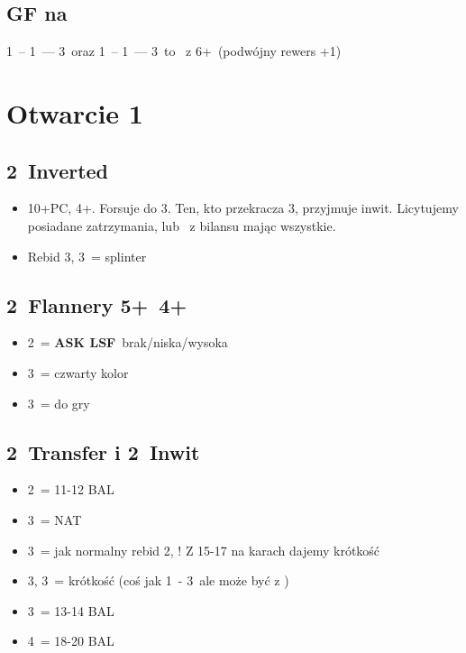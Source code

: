 \documentclass[12pt, a4paper]{article}
\newcommand{\lsf}{\color{WildStrawberry}\textbf{ASK LSF}\color{black}}
\newcommand*\link[1]{\hspace*{0em plus 1fill}\makebox{#1}}
\newcommand{\exq}{\color{JungleGreen}\link{\textbf{\large{?!}}}\color{black}}
\begin{document}
\subsection*{GF na \clubs}
1\clubs\ -- 1\hearts\ --- 3\diams\ oraz 1\clubs\ -- 1\spades\ --- 3\diams\ to \gf\ z 6+\clubs\ (podwójny rewers +1)


\pagebreak
\section{Otwarcie 1\diams}
\subsection{2\diams\ Inverted}
\begin{itemize}
    \item 10+PC, 4+\diams. Forsuje do 3\diams. Ten, kto przekracza 3\diams, przyjmuje inwit.
    Licytujemy posiadane zatrzymania, lub \nt\ z bilansu mając wszystkie.
    \item Rebid 3\hearts, 3\spades\ = splinter
\end{itemize}

\subsection*{2\hearts\ Flannery 5+\spades\ 4+\hearts}
\begin{itemize}
    \item 2\nt\ = \lsf\ brak/niska/wysoka \exq
    \item 3\clubs\ = czwarty kolor \gf
    \item 3\diams\ = do gry
\end{itemize}

\subsection*{2\spades\ Transfer i 2\ntx\ Inwit}
\begin{itemize}
    \item 2\nt\ = 11-12 BAL
    \item 3\clubs\ = NAT \nf
    \item 3\diams\ = jak normalny rebid 2\diams, \nf! Z 15-17 na karach dajemy krótkość
    \item 3\hearts, 3\spades\ = krótkość (coś jak 1\nt\ - 3\hearts\ ale może być z \diams)
    \item 3\nt\ = 13-14 BAL
    \item 4\nt\ = 18-20 BAL
\end{itemize}
\end{document}
